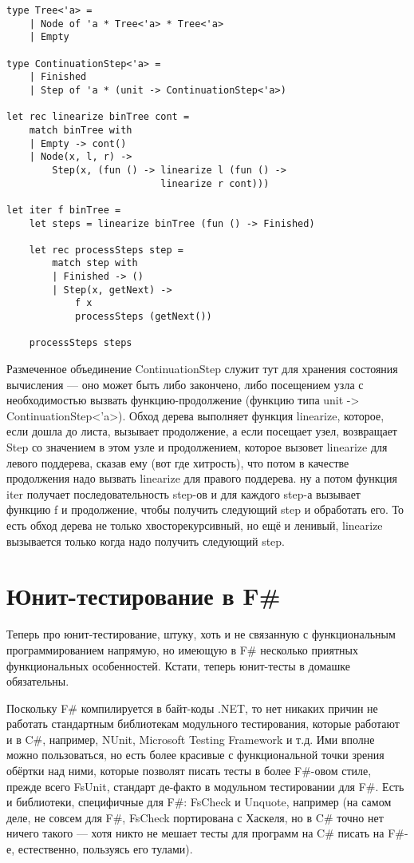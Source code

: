 \documentclass[a5paper]{article}
\begin{document}
\begin{verbatim}
type Tree<'a> =
    | Node of 'a * Tree<'a> * Tree<'a>
    | Empty

type ContinuationStep<'a> =
    | Finished
    | Step of 'a * (unit -> ContinuationStep<'a>)

let rec linearize binTree cont =
    match binTree with
    | Empty -> cont()
    | Node(x, l, r) ->
        Step(x, (fun () -> linearize l (fun () -> 
                           linearize r cont)))

let iter f binTree =
    let steps = linearize binTree (fun () -> Finished)

    let rec processSteps step =
        match step with
        | Finished -> ()
        | Step(x, getNext) -> 
            f x
            processSteps (getNext())
    
    processSteps steps
\end{verbatim}

Размеченное объединение ContinuationStep служит тут для хранения состояния вычисления --- оно может быть либо закончено, либо посещением узла с необходимостью вызвать функцию-продолжение (функцию типа unit -> ContinuationStep<'a>). Обход дерева выполняет функция linearize, которое, если дошла до листа, вызывает продолжение, а если посещает узел, возвращает Step со значением в этом узле и продолжением, которое вызовет linearize для левого поддерева, сказав ему (вот где хитрость), что потом в качестве продолжения надо вызвать linearize для правого поддерева. ну а потом функция iter получает последовательность step-ов и для каждого step-а вызывает функцию f и продолжение, чтобы получить следующий step и обработать его. То есть обход дерева не только хвосторекурсивный, но ещё и ленивый, linearize вызывается только когда надо получить следующий step.

\section{Юнит-тестирование в F\#}

Теперь про юнит-тестирование, штуку, хоть и не связанную с функциональным программированием напрямую, но имеющую в F\# несколько приятных функциональных особенностей. Кстати, теперь юнит-тесты в домашке обязательны.

Поскольку F\# компилируется в байт-коды .NET, то нет никаких причин не работать стандартным библиотекам модульного тестирования, которые работают и в C\#, например, NUnit, Microsoft Testing Framework и т.д. Ими вполне можно пользоваться, но есть более красивые с функциональной точки зрения обёртки над ними, которые позволят писать тесты в более F\#-овом стиле, прежде всего FsUnit, стандарт де-факто в модульном тестировании для F\#. Есть и библиотеки, специфичные для F\#: FsCheck и Unquote, например (на самом деле, не совсем для F\#, FsCheck портирована с Хаскеля, но в C\# точно нет ничего такого --- хотя никто не мешает тесты для программ на C\# писать на F\#-е, естественно, пользуясь его тулами).
\end{document}
